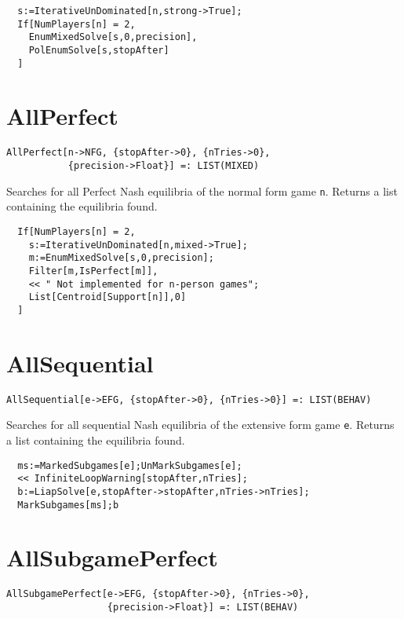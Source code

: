 \udfbody
\begin{verbatim}
  s:=IterativeUnDominated[n,strong->True];
  If[NumPlayers[n] = 2, 
    EnumMixedSolve[s,0,precision],
    PolEnumSolve[s,stopAfter]
  ]
\end{verbatim} 


\section*{AllPerfect}\label{ExtAllPerfect}
\begin{verbatim}
AllPerfect[n->NFG, {stopAfter->0}, {nTries->0}, 
           {precision->Float}] =: LIST(MIXED) 
\end{verbatim}

Searches for all Perfect Nash equilibria of the normal form game
\verb+n+.  Returns a list containing the equilibria found.

\udfbody
\begin{verbatim}
  If[NumPlayers[n] = 2, 
    s:=IterativeUnDominated[n,mixed->True];
    m:=EnumMixedSolve[s,0,precision];
    Filter[m,IsPerfect[m]],
    << " Not implemented for n-person games";
    List[Centroid[Support[n]],0]
  ]
\end{verbatim} 

	
\section*{AllSequential}\label{ExtAllSequential}
\begin{verbatim}
AllSequential[e->EFG, {stopAfter->0}, {nTries->0}] =: LIST(BEHAV) 
\end{verbatim}

Searches for all sequential Nash equilibria of the extensive form
game \verb+e+.  Returns a list containing the equilibria found.

\udfbody
\begin{verbatim}
  ms:=MarkedSubgames[e];UnMarkSubgames[e];
  << InfiniteLoopWarning[stopAfter,nTries];
  b:=LiapSolve[e,stopAfter->stopAfter,nTries->nTries];
  MarkSubgames[ms];b
\end{verbatim} 


\section*{AllSubgamePerfect}\label{ExtAllSubgamePerfect}
\begin{verbatim}
AllSubgamePerfect[e->EFG, {stopAfter->0}, {nTries->0}, 
                  {precision->Float}] =: LIST(BEHAV) 
\end{verbatim}

